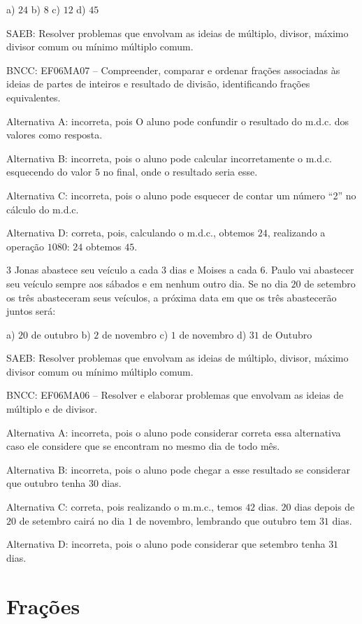 a) $24$ b) $8$ c) $12$ d) $45$

SAEB: Resolver problemas que envolvam as ideias de múltiplo, divisor,
máximo divisor comum ou mínimo múltiplo comum.

BNCC: EF06MA07 -- Compreender, comparar e ordenar frações associadas às
ideias de partes de inteiros e resultado de divisão, identificando
frações equivalentes.

Alternativa A: incorreta, pois O aluno pode confundir o resultado do
m.d.c. dos valores como resposta.

Alternativa B: incorreta, pois o aluno pode calcular incorretamente o
m.d.c. esquecendo do valor $5$ no final, onde o resultado seria esse.

Alternativa C: incorreta, pois o aluno pode esquecer de contar um número
``2'' no cálculo do m.d.c.

Alternativa D: correta, pois, calculando o m.d.c., obtemos $24$,
realizando a operação $1080$: $24$ obtemos $45$.

\num{3}  Jonas abastece seu veículo a cada $3$ dias e Moises a cada $6$. Paulo vai
abastecer seu veículo sempre aos sábados e em nenhum outro dia. Se no
dia $20$ de setembro os três abasteceram seus veículos, a próxima data em
que os três abastecerão juntos será:

a) $20$ de outubro b) $2$ de novembro c) $1$ de novembro d) $31$ de Outubro

SAEB: Resolver problemas que envolvam as ideias de múltiplo, divisor,
máximo divisor comum ou mínimo múltiplo comum.

BNCC: EF06MA06 -- Resolver e elaborar problemas que envolvam as ideias
de múltiplo e de divisor.

Alternativa A: incorreta, pois o aluno pode considerar correta essa
alternativa caso ele considere que se encontram no mesmo dia de todo
mês.

Alternativa B: incorreta, pois o aluno pode chegar a esse resultado se
considerar que outubro tenha $30$ dias.

Alternativa C: correta, pois realizando o m.m.c., temos $42$ dias. $20$ dias
depois de $20$ de setembro cairá no dia $1$ de novembro, lembrando que
outubro tem $31$ dias.

Alternativa D: incorreta, pois o aluno pode considerar que setembro
tenha $31$ dias.

\chapter{Frações}


